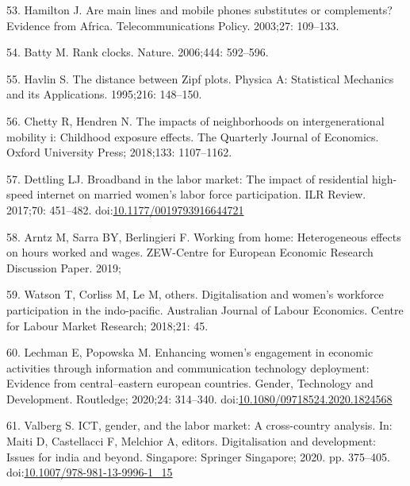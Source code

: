 \documentclass[10pt,letterpaper]{article}
\begin{document}
\leavevmode\hypertarget{ref-hamilton_are_2003}{}%
53. Hamilton J. Are main lines and mobile phones substitutes or
complements? Evidence from Africa. Telecommunications Policy. 2003;27:
109--133.

\leavevmode\hypertarget{ref-batty_rank_2006}{}%
54. Batty M. Rank clocks. Nature. 2006;444: 592--596.

\leavevmode\hypertarget{ref-havlin_distance_1995}{}%
55. Havlin S. The distance between Zipf plots. Physica A: Statistical
Mechanics and its Applications. 1995;216: 148--150.

\leavevmode\hypertarget{ref-chetty2018impacts}{}%
56. Chetty R, Hendren N. The impacts of neighborhoods on
intergenerational mobility i: Childhood exposure effects. The Quarterly
Journal of Economics. Oxford University Press; 2018;133: 1107--1162.

\leavevmode\hypertarget{ref-dettling2017}{}%
57. Dettling LJ. Broadband in the labor market: The impact of
residential high-speed internet on married women's labor force
participation. ILR Review. 2017;70: 451--482.
doi:\href{https://doi.org/10.1177/0019793916644721}{10.1177/0019793916644721}

\leavevmode\hypertarget{ref-arntz2019working}{}%
58. Arntz M, Sarra BY, Berlingieri F. Working from home: Heterogeneous
effects on hours worked and wages. ZEW-Centre for European Economic
Research Discussion Paper. 2019;

\leavevmode\hypertarget{ref-watson2018digitalisation}{}%
59. Watson T, Corliss M, Le M, others. Digitalisation and women's
workforce participation in the indo-pacific. Australian Journal of
Labour Economics. Centre for Labour Market Research; 2018;21: 45.

\leavevmode\hypertarget{ref-Lechman2020}{}%
60. Lechman E, Popowska M. Enhancing women's engagement in economic
activities through information and communication technology deployment:
Evidence from central--eastern european countries. Gender, Technology
and Development. Routledge; 2020;24: 314--340.
doi:\href{https://doi.org/10.1080/09718524.2020.1824568}{10.1080/09718524.2020.1824568}

\leavevmode\hypertarget{ref-Valberg2020}{}%
61. Valberg S. ICT, gender, and the labor market: A cross-country
analysis. In: Maiti D, Castellacci F, Melchior A, editors.
Digitalisation and development: Issues for india and beyond. Singapore:
Springer Singapore; 2020. pp. 375--405.
doi:\href{https://doi.org/10.1007/978-981-13-9996-1_15}{10.1007/978-981-13-9996-1\_15}
\end{document}
